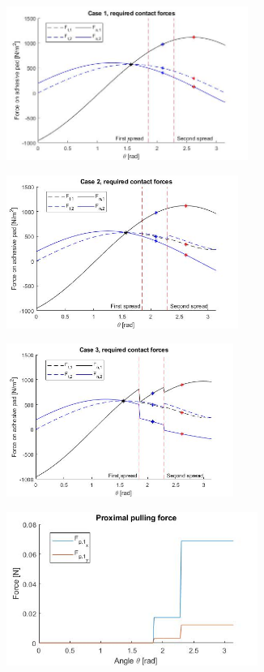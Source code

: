 \begin{figure}[h!]
    \begin{subfigure}{0.48\textwidth}
    \includegraphics[width=\textwidth, height=5cm, angle=0]{images/limb spreading/FBD_case_1.jpg}
    \caption{}
    \label{fig:case_1}
    \end{subfigure}
    \hfill
    \begin{subfigure}{0.48\textwidth}
    \includegraphics[width=\textwidth, height=5cm, angle=0]{images/limb spreading/FBD_case_2.jpg}
    \caption{}
    \label{fig:case_2}
    \end{subfigure}
    \hfill
    \begin{subfigure}{0.48\textwidth}
    \includegraphics[width=\textwidth, height=5cm, angle=0]{images/limb spreading/FBD_case_3.jpg}
    \caption{}
    \label{fig:case_3}
    \end{subfigure}  
    \begin{subfigure}{0.48\textwidth}
    \includegraphics[width=\textwidth, height=5cm, angle=0]{images/limb spreading/pulling_force.jpg}

\end{subfigure}
\end{figure}
